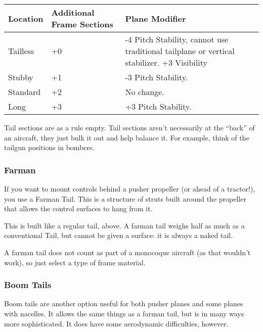 \documentclass{article}
\begin{document}
\begin{tabular}{|l|l|l|}
  \hline
  Location & Additional Frame Sections & Plane Modifier                                          \\\hline
  Tailless & +0                        & -4 Pitch Stability, cannot use traditional tailplane or
  vertical stabilizer. +3 Visibility                                                             \\\hline
  Stubby   & +1                        & -3 Pitch Stability.                                     \\\hline
  Standard & +2                        & No change.                                              \\\hline
  Long     & +3                        & +3 Pitch Stability.                                     \\\hline
\end{tabular}

Tail sections are as a rule empty. Tail sections aren't
necessarily at the ``back'' of an aircraft, they just bulk it out and
help balance it. For example, think of the tailgun positions in
bombers.

\subsubsection{Farman}
\label{_Farman}

If you want to mount controls behind a pusher propeller (or ahead of a
tractor!), you use a Farman Tail. This is a structure of struts built
around the propeller that allows the control surfaces to hang from it.

This is built like a regular tail, above. A farman tail weighs half as
much as a conventional Tail, but cannot be given a surface: it is always
a naked tail.

A farman tail does not count as part of a monocoque aircraft (as that
wouldn't work), so just select a type of frame material.

\subsubsection{Boom Tails}
\label{_Boom Tails}

Boom tails are another option useful for both pusher planes and some
planes with nacelles. It allows the same things as a farman tail, but is
in many ways more sophisticated. It does have some aerodynamic
difficulties, however.
\end{document}
